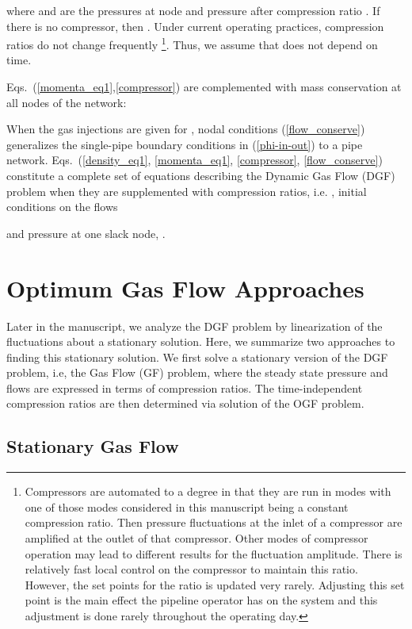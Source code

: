 \documentclass[10pt, conference, compsocconf]{IEEEtran}
\begin{document}
where  and  are the pressures at node  and pressure after compression ratio  . If there is no compressor, then . Under current operating practices, compression ratios do not change frequently \footnote{Compressors are automated to a degree in that they are run in modes with one of those modes considered in this manuscript being a constant compression ratio. Then pressure fluctuations at the inlet of a compressor are amplified at the outlet of that compressor.  Other modes of compressor operation may lead to different results for the fluctuation amplitude. There is relatively fast local control on the compressor to maintain this ratio. However, the set points for the ratio is updated very rarely. Adjusting this set point is the main effect the pipeline operator has on the system and this adjustment is done rarely throughout the operating day.}. Thus, we assume that  does not depend on time.

Eqs.~(\ref{momenta_eq1},\ref{compressor}) are complemented with mass conservation at all nodes of the network:

When the gas injections  are given for , nodal conditions (\ref{flow_conserve}) generalizes the single-pipe boundary conditions in (\ref{phi-in-out}) to a pipe network. Eqs.~(\ref{density_eq1}, \ref{momenta_eq1}, \ref{compressor}, \ref{flow_conserve}) constitute a complete set of equations describing the Dynamic Gas Flow (DGF) problem when they are supplemented with compression ratios, i.e. , initial conditions on the flows

and pressure at one slack node, .








\section{Optimum Gas Flow Approaches}
\label{sec:OGF}


Later in the manuscript, we analyze the DGF problem by linearization of the fluctuations about a stationary solution.  Here, we summarize two approaches to finding this stationary solution.  We first solve a stationary version of the DGF problem, i.e, the Gas Flow (GF) problem, where the steady state pressure and flows are expressed in terms of compression ratios.  The time-independent compression ratios are then determined via solution of the OGF problem.

\subsection{Stationary Gas Flow}
\label{sec:steady}
\end{document}
